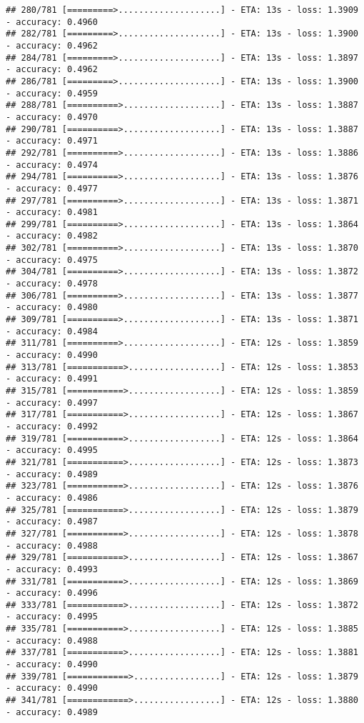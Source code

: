 \documentclass[
]{article}
\begin{document}
\begin{verbatim}
## 280/781 [=========>....................] - ETA: 13s - loss: 1.3909 - accuracy: 0.4960
## 282/781 [=========>....................] - ETA: 13s - loss: 1.3900 - accuracy: 0.4962
## 284/781 [=========>....................] - ETA: 13s - loss: 1.3897 - accuracy: 0.4962
## 286/781 [=========>....................] - ETA: 13s - loss: 1.3900 - accuracy: 0.4959
## 288/781 [==========>...................] - ETA: 13s - loss: 1.3887 - accuracy: 0.4970
## 290/781 [==========>...................] - ETA: 13s - loss: 1.3887 - accuracy: 0.4971
## 292/781 [==========>...................] - ETA: 13s - loss: 1.3886 - accuracy: 0.4974
## 294/781 [==========>...................] - ETA: 13s - loss: 1.3876 - accuracy: 0.4977
## 297/781 [==========>...................] - ETA: 13s - loss: 1.3871 - accuracy: 0.4981
## 299/781 [==========>...................] - ETA: 13s - loss: 1.3864 - accuracy: 0.4982
## 302/781 [==========>...................] - ETA: 13s - loss: 1.3870 - accuracy: 0.4975
## 304/781 [==========>...................] - ETA: 13s - loss: 1.3872 - accuracy: 0.4978
## 306/781 [==========>...................] - ETA: 13s - loss: 1.3877 - accuracy: 0.4980
## 309/781 [==========>...................] - ETA: 13s - loss: 1.3871 - accuracy: 0.4984
## 311/781 [==========>...................] - ETA: 12s - loss: 1.3859 - accuracy: 0.4990
## 313/781 [===========>..................] - ETA: 12s - loss: 1.3853 - accuracy: 0.4991
## 315/781 [===========>..................] - ETA: 12s - loss: 1.3859 - accuracy: 0.4997
## 317/781 [===========>..................] - ETA: 12s - loss: 1.3867 - accuracy: 0.4992
## 319/781 [===========>..................] - ETA: 12s - loss: 1.3864 - accuracy: 0.4995
## 321/781 [===========>..................] - ETA: 12s - loss: 1.3873 - accuracy: 0.4989
## 323/781 [===========>..................] - ETA: 12s - loss: 1.3876 - accuracy: 0.4986
## 325/781 [===========>..................] - ETA: 12s - loss: 1.3879 - accuracy: 0.4987
## 327/781 [===========>..................] - ETA: 12s - loss: 1.3878 - accuracy: 0.4988
## 329/781 [===========>..................] - ETA: 12s - loss: 1.3867 - accuracy: 0.4993
## 331/781 [===========>..................] - ETA: 12s - loss: 1.3869 - accuracy: 0.4996
## 333/781 [===========>..................] - ETA: 12s - loss: 1.3872 - accuracy: 0.4995
## 335/781 [===========>..................] - ETA: 12s - loss: 1.3885 - accuracy: 0.4988
## 337/781 [===========>..................] - ETA: 12s - loss: 1.3881 - accuracy: 0.4990
## 339/781 [============>.................] - ETA: 12s - loss: 1.3879 - accuracy: 0.4990
## 341/781 [============>.................] - ETA: 12s - loss: 1.3880 - accuracy: 0.4989

\end{verbatim}
\end{document}
